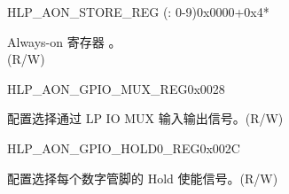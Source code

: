 \begin{register}{H}{LP\_AON\_STORE\_REG (: 0-9)}{0x0000+0x4*}\label{regdesc:LPAONSTORENREG}
%
\regnewline%
\begin{regdesc}\begin{reglist}
\label{fielddesc:LPAONSTOREN}\item [LP\_AON\_STORE\regindex{n}] Always-on 寄存器 。 \\(R/W)
\end{reglist}\end{regdesc}
\end{register}


\begin{register}{H}{LP\_AON\_GPIO\_MUX\_REG}{0x0028}\label{regdesc:LPAONGPIOMUXREG}
%
%
\regnewline%
\begin{regdesc}\begin{reglist}
\label{fielddesc:LPAONGPIOMUXSEL}\item [LP\_AON\_GPIO\_MUX\_SEL] 配置选择通过 LP IO MUX 输入输出信号。(R/W)
\end{reglist}\end{regdesc}
\end{register}


\begin{register}{H}{LP\_AON\_GPIO\_HOLD0\_REG}{0x002C}\label{regdesc:LPAONGPIOHOLD0REG}
%
\regnewline%
\begin{regdesc}\begin{reglist}
\label{fielddesc:LPAONGPIOHOLD0}\item [LP\_AON\_GPIO\_HOLD0] 配置选择每个数字管脚的 Hold 使能信号。(R/W)
\end{reglist}\end{regdesc}
\end{register}


